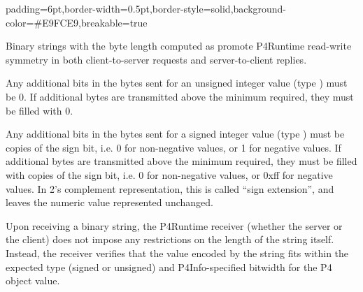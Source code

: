 \documentclass[11pt]{article}
\begin{document}
{%
\begin{mdbmargintb}{6pt}{6pt}%
\begin{mdblock}{padding=6pt,border-width=0.5pt,border-style=solid,background-color=\#E9FCE9,breakable=true}%
\begin{mdpre}%
\end{mdpre}%
\end{mdblock}%
\end{mdbmargintb}%

\noindent{}Binary strings with the byte length computed as  promote
P4Runtime read-write symmetry in both client-to-server requests and
server-to-client replies.%

Any additional bits in the bytes sent for an unsigned integer value (type
) must be 0.  If additional bytes are transmitted above the
 minimum required, they must be filled with 0.%

Any additional bits in the bytes sent for a signed integer value (type )
must be copies of the sign bit, i.e. 0 for non-negative values, or 1 for
negative values. If additional bytes are transmitted above the
 minimum required, they must be filled with copies of the
sign bit, i.e. 0 for non-negative values, or 0xff for negative values. In 2's
complement representation, this is called \textquotedblleft{}sign extension\textquotedblright{}, and leaves the
numeric value represented unchanged.%

Upon receiving a binary string, the P4Runtime receiver (whether the server or
the client) does not impose any restrictions on the length of the string
itself. Instead, the receiver verifies that the value encoded by the string fits
within the expected type (signed or unsigned) and P4Info-specified bitwidth for
the P4 object value.%

}
\end{document}
